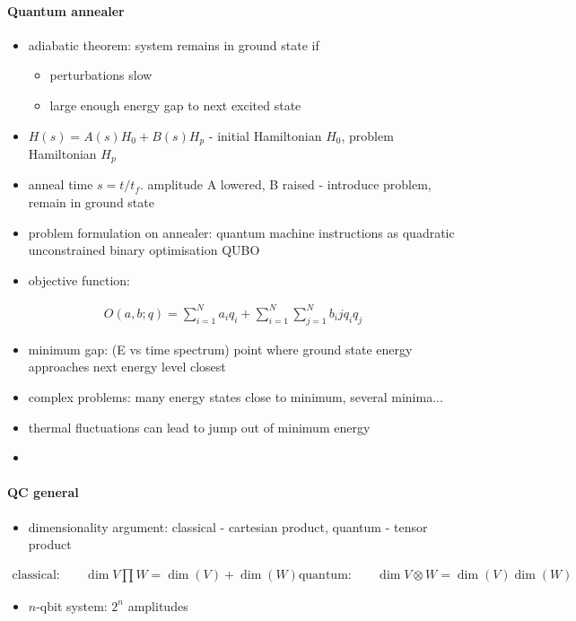 \paragraph{Quantum annealer}
\begin{itemize}
  \item adiabatic theorem: system remains in ground state if 
  \begin{itemize}
	\item perturbations slow
	\item large enough energy gap to next excited state
  \end{itemize}
  \item  $H(s)=A(s)H_0+B(s)H_p$ - initial Hamiltonian $H_0$, problem Hamiltonian $H_p$
  \item anneal time $s=t/t_f$. amplitude A lowered, B raised - introduce problem, remain in ground state
  \item problem formulation on annealer: quantum machine instructions as quadratic unconstrained binary optimisation QUBO
  \item objective function:
\end{itemize}
\begin{align}
  O(a,b;q)=\sum_{i=1}^{N}{a_iq_i}+\sum_{i=1}^{N}\sum_{j=1}^{N}{b_ijq_iq_j}
\end{align}
\begin{itemize}
  \item minimum gap: (E vs time spectrum) point where ground state energy approaches next energy level closest
  \item complex problems:  many energy states close to minimum, several minima...
  \item thermal fluctuations can lead to jump out of minimum energy
\end{itemize}
\begin{itemize}
  \item 
\end{itemize}

\paragraph{QC general}
\begin{itemize}
  \item dimensionality argument: classical - cartesian product, quantum - tensor product
\end{itemize}
\begin{align}	
  \mathrm{classical:}\quad& \dim{V \prod W}=\dim(V)+\dim(W)
  \mathrm{quantum:}\quad&   \dim{V \otimes W}=\dim(V)\dim(W)
\end{align}
\begin{itemize}
  \item $n$-qbit system: $2^n$ amplitudes
\end{itemize}

